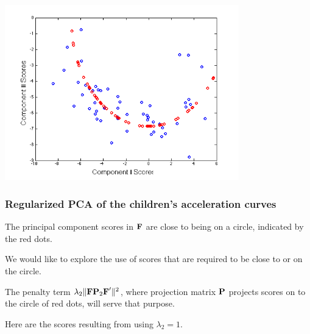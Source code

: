 \documentclass[11pt]{beamer}
\begin{document}

\begin{frame}

\begin{center}
\includegraphics[width=4in]{figs/GrowthScore_0.png}
\end{center}

\end{frame}


\begin{frame}

\frametitle{Regularized PCA of the children's acceleration curves}

\bi
  \item The principal component scores in $\mbox{\bf F}$ are close to being on a circle,
  indicated by the red dots.
  \item We would like to explore the use of scores that are required to be close to or on the circle.
  \item The penalty term $\lambda_2 \| \mbox{\bf F}  \mbox{\bf P}_2 \mbox{\bf F}' \|^2$, where projection matrix $\mbox{\bf P}$ projects scores on to the circle of red dots, will serve that purpose.
  \item Here are the scores resulting from using $\lambda_2 = 1$.
\ei

\end{frame}

\end{document}
